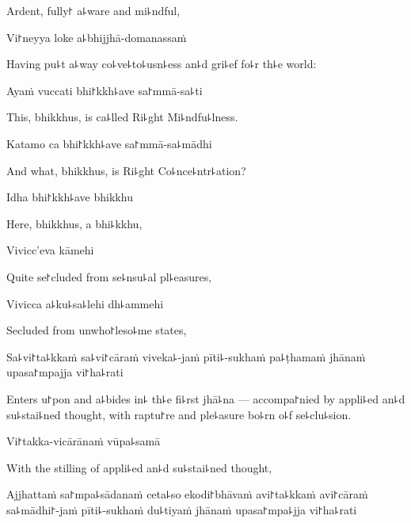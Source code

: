 \begin{english}
  Ardent, fully꜓ a꜕ware and mi꜕ndful,
\end{english}

Vi꜓neyya loke a꜕bhijjhā-domanassaṁ

\begin{english}
  Having pu꜕t a꜕way co꜕ve꜕to꜕usn꜕ess an꜕d gri꜕ef fo꜕r th꜕e world:
\end{english}

Ayaṁ vuccati bhi꜓kkh꜕ave sa꜓mmā-sa꜕ti

\begin{english}
  This, bhikkhus, is ca꜕lled Ri꜕ght Mi꜕ndfu꜕lness.
\end{english}

\ifaivedition
\clearpage
\fi

Katamo ca bhi꜓kkh꜕ave sa꜓mmā-sa꜕mādhi

\begin{english}
  And what, bhikkhus, is Ri꜕ght Co꜕nce꜕ntr꜕ation?
\end{english}

Idha bhi꜓kkh꜕ave bhikkhu

\begin{english}
  Here, bhikkhus, a bhi꜕kkhu,
\end{english}

Vivicc'eva kāmehi

\begin{english}
  Quite se꜓cluded from se꜕nsu꜕al pl꜕easures,
\end{english}

Vivicca a꜕ku꜕sa꜕lehi dh꜕ammehi

\begin{english}
  Secluded from unwho꜓leso꜕me states,
\end{english}

Sa꜕vi꜓ta꜕kkaṁ sa꜕vi꜓cāraṁ viveka꜕-jaṁ pīti꜕-sukhaṁ pa꜕ṭhamaṁ jhānaṁ upasa꜓mpajja vi꜓ha꜕rati

\begin{english}
  Enters u꜓pon and a꜕bides in꜕ th꜕e fi꜕rst jhā꜕na --- accompa꜓nied by
  appli꜕ed an꜕d su꜕stai꜕ned thought, with raptu꜓re and ple꜕asure bo꜕rn
  o꜕f se꜕clu꜕sion.
\end{english}

Vi꜓takka-vicārānaṁ vūpa꜕samā

\begin{english}
  With the stilling of appli꜕ed an꜕d su꜕stai꜕ned thought,
\end{english}

Ajjhattaṁ sa꜓mpa꜕sādanaṁ ceta꜕so ekodi꜓bhāvaṁ avi꜓ta꜕kkaṁ avi꜓cāraṁ sa꜕mādhi꜓-jaṁ pīti꜕-sukhaṁ du꜕tiyaṁ jhānaṁ upasa꜓mpa꜕jja vi꜓ha꜕rati

